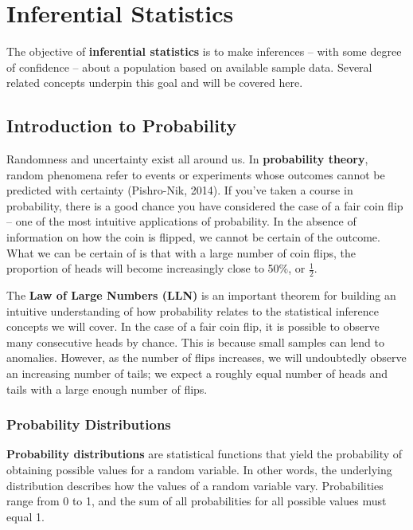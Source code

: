 \documentclass[]{book}
\begin{document}
\hypertarget{inf-stats}{%
\chapter{Inferential Statistics}\label{inf-stats}}

The objective of \textbf{inferential statistics} is to make inferences -- with some degree of confidence -- about a population based on available sample data. Several related concepts underpin this goal and will be covered here.

\hypertarget{introduction-to-probability}{%
\section{Introduction to Probability}\label{introduction-to-probability}}

Randomness and uncertainty exist all around us. In \textbf{probability theory}, random phenomena refer to events or experiments whose outcomes cannot be predicted with certainty (Pishro-Nik, 2014). If you've taken a course in probability, there is a good chance you have considered the case of a fair coin flip -- one of the most intuitive applications of probability. In the absence of information on how the coin is flipped, we cannot be certain of the outcome. What we can be certain of is that with a large number of coin flips, the proportion of heads will become increasingly close to 50\%, or \(\frac{1}{2}\).

The \textbf{Law of Large Numbers (LLN)} is an important theorem for building an intuitive understanding of how probability relates to the statistical inference concepts we will cover. In the case of a fair coin flip, it is possible to observe many consecutive heads by chance. This is because small samples can lend to anomalies. However, as the number of flips increases, we will undoubtedly observe an increasing number of tails; we expect a roughly equal number of heads and tails with a large enough number of flips.

\hypertarget{probability-distributions}{%
\subsection{Probability Distributions}\label{probability-distributions}}

\textbf{Probability distributions} are statistical functions that yield the probability of obtaining possible values for a random variable. In other words, the underlying distribution describes how the values of a random variable vary. Probabilities range from 0 to 1, and the sum of all probabilities for all possible values must equal 1.
\end{document}
